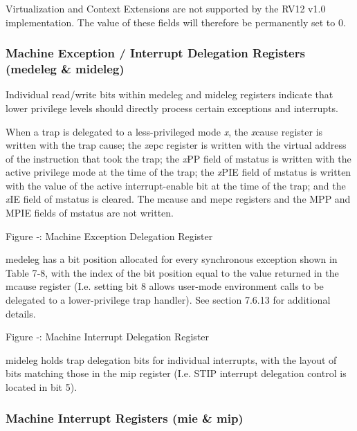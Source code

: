 Virtualization and Context Extensions are not supported by the RV12 v1.0
implementation. The value of these fields will therefore be permanently
set to 0.

\subsubsection{Machine Exception / Interrupt Delegation Registers
(medeleg \&
mideleg)}\label{machine-exception-interrupt-delegation-registers-medeleg-mideleg}

Individual read/write bits within medeleg and mideleg registers indicate
that lower privilege levels should directly process certain exceptions
and interrupts.

When a trap is delegated to a less-privileged mode \emph{x}, the
\emph{x}cause register is written with the trap cause; the \emph{x}epc
register is written with the virtual address of the instruction that
took the trap; the \emph{x}PP field of mstatus is written with the
active privilege mode at the time of the trap; the \emph{x}PIE field of
mstatus is written with the value of the active interrupt-enable bit at
the time of the trap; and the \emph{x}IE field of mstatus is cleared.
The mcause and mepc registers and the MPP and MPIE fields of mstatus are
not written.

\missingfigure{}

\protect\hypertarget{_Ref367088718}{}{}Figure ‑: Machine Exception
Delegation Register

medeleg has a bit position allocated for every synchronous exception
shown in Table 7‑8, with the index of the bit position equal to the
value returned in the mcause register (I.e. setting bit 8 allows
user-mode environment calls to be delegated to a lower-privilege trap
handler). See section 7.6.13 for additional details.

\missingfigure{}

\protect\hypertarget{_Ref367088721}{}{}Figure ‑: Machine Interrupt
Delegation Register

mideleg holds trap delegation bits for individual interrupts, with the
layout of bits matching those in the mip register (I.e. STIP interrupt
delegation control is located in bit 5).

\subsubsection{Machine Interrupt Registers (mie \&
mip)}\label{machine-interrupt-registers-mie-mip}

